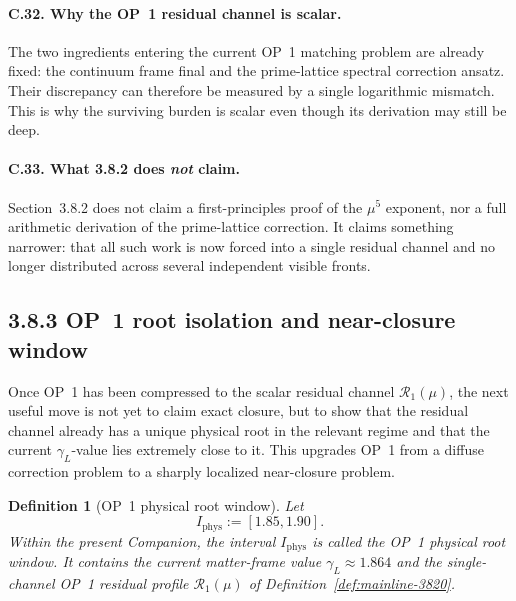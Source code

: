 \documentclass[12pt,a4paper]{article}
\newtheorem{definition}[theorem]{Definition}
\begin{document}
\paragraph{C.32. Why the OP~1 residual channel is scalar.}
The two ingredients entering the current OP~1 matching problem are already fixed: the continuum frame final and the prime-lattice spectral correction ansatz. Their discrepancy can therefore be measured by a single logarithmic mismatch. This is why the surviving burden is scalar even though its derivation may still be deep.

\paragraph{C.33. What 3.8.2 does \emph{not} claim.}
Section~3.8.2 does not claim a first-principles proof of the \(\mu^5\) exponent, nor a full arithmetic derivation of the prime-lattice correction. It claims something narrower: that all such work is now forced into a single residual channel and no longer distributed across several independent visible fronts.


\subsection*{3.8.3 OP~1 root isolation and near-closure window}
Once OP~1 has been compressed to the scalar residual channel \(\mathcal R_{1}(\mu)\), the next useful move is not yet to claim exact closure, but to show that the residual channel already has a unique physical root in the relevant regime and that the current \(\gamma_L\)-value lies extremely close to it. This upgrades OP~1 from a diffuse correction problem to a sharply localized near-closure problem.

\begin{definition}[OP~1 physical root window]
\label{def:mainline-3830}
Let
\[
 I_{\mathrm{phys}}:=[1.85,1.90].
\]
Within the present Companion, the interval \(I_{\mathrm{phys}}\) is called the \emph{OP~1 physical root window}. It contains the current matter-frame value \(\gamma_L\approx 1.864\) and the single-channel OP~1 residual profile \(\mathcal R_1(\mu)\) of Definition~\ref{def:mainline-3820}.
\end{definition}
\end{document}
